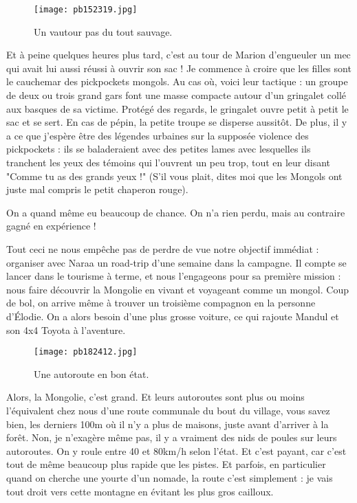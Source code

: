 \documentclass{book}
\begin{document}
\begin{wrapfigure}{l}{0.55\textwidth}
\centering
\texttt{[image: pb152319.jpg]}
\caption*{ Un vautour pas du tout sauvage.}
\end{wrapfigure}


Et à peine quelques heures plus tard, c'est au tour de Marion d'engueuler un mec qui avait lui aussi réussi à ouvrir son sac ! Je commence à croire que les filles sont le cauchemar des pickpockets mongols. Au cas où, voici leur tactique : un groupe de deux ou trois grand gars font une masse compacte autour d'un gringalet collé aux basques de sa victime. Protégé des regards, le gringalet ouvre petit à petit le sac et se sert. En cas de pépin, la petite troupe se disperse aussitôt. De plus, il y a ce que j'espère être des légendes urbaines sur la supposée violence des pickpockets : ils se baladeraient avec des petites lames avec lesquelles ils tranchent les yeux des témoins qui l'ouvrent un peu trop, tout en leur disant "Comme tu as des grands yeux !" (S'il vous plait, dites moi que les Mongols ont juste mal compris le petit chaperon rouge).

On a quand même eu beaucoup de chance. On n'a rien perdu, mais au contraire gagné en expérience !

Tout ceci ne nous empêche pas de perdre de vue notre objectif immédiat : organiser avec Naraa un road-trip d'une semaine dans la campagne. Il compte se lancer dans le tourisme à terme, et nous l'engageons pour sa première mission : nous faire découvrir la Mongolie en vivant et voyageant comme un mongol. Coup de bol, on arrive même à trouver un troisième compagnon en la personne d’Élodie. On a alors besoin d'une plus grosse voiture, ce qui rajoute Mandul et son 4x4 Toyota à l'aventure.


\begin{figure}[h]
\centering
\texttt{[image: pb182412.jpg]}
\caption*{ Une autoroute en bon état.}
\end{figure}

Alors, la Mongolie, c'est grand. Et leurs autoroutes sont plus ou moins l'équivalent chez nous d'une route communale du bout du village, vous savez bien, les derniers 100m où il n'y a plus de maisons, juste avant d'arriver à la forêt. Non, je n'exagère même pas, il y a vraiment des nids de poules sur leurs autoroutes. On y roule entre 40 et 80km/h selon l'état. Et c'est payant, car c'est tout de même beaucoup plus rapide que les pistes. Et parfois, en particulier quand on cherche une yourte d'un nomade, la route c'est simplement : je vais tout droit vers cette montagne en évitant les plus gros cailloux.
\end{document}
